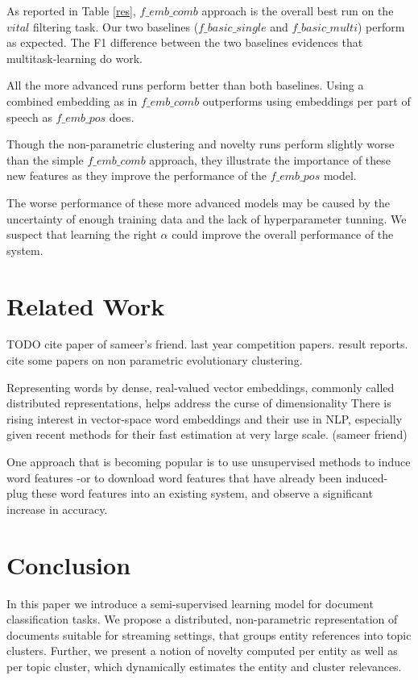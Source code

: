 \documentclass{article}
\begin{document}
As reported in Table \ref{res}, $f\_emb\_comb$ approach is the overall best run on the $vital$ filtering task. Our two baselines ($f\_basic\_single$ and $f\_basic\_multi$) perform as expected. The F1 difference between the two baselines evidences that multitask-learning do work.

All the more advanced runs perform better than both baselines. Using a combined embedding as in $f\_emb\_comb$ outperforms using embeddings per part of speech as $f\_emb\_pos$ does.

Though the non-parametric clustering and novelty runs perform slightly worse than the simple $f\_emb\_comb$ approach, they illustrate the importance of these new features as they improve the performance of the $f\_emb\_pos$ model.

The worse performance of these more advanced models may be caused by the uncertainty of enough training data and the lack of hyperparameter tunning. We suspect that learning the right $\alpha$ could improve the overall performance of the system.

\section{Related Work}
\label{related}

TODO 
cite paper of sameer's friend.
last year competition papers. result reports.
cite some papers on non parametric evolutionary clustering.

Representing words by dense, real-valued vector embeddings, commonly called distributed representations, helps address the curse of dimensionality
There is rising interest in vector-space word embeddings and their use in NLP, especially given recent methods for their fast estimation at very large scale. (sameer friend)

One approach that is becoming popular is to use unsupervised methods to induce word features -or to download word features that have already been induced- plug these word features into an existing system, and observe a significant increase in accuracy.

\section{Conclusion}
\label{conclusion}

In this paper we introduce a semi-supervised learning model for document classification tasks. We propose a distributed, non-parametric representation of documents suitable for streaming settings, that groups entity references into topic clusters. Further, we present a notion of novelty computed per entity as well as per topic cluster, which dynamically estimates the entity and cluster relevances.
\end{document}
